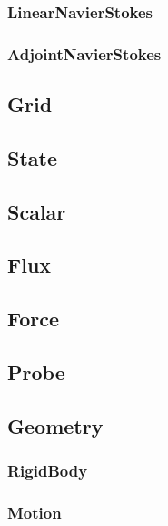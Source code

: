 \documentclass[11pt]{article}
\begin{document}
\subsubsection{LinearNavierStokes}
\subsubsection{AdjointNavierStokes}

\subsection{Grid}

\subsection{State}

\subsection{Scalar}
\subsection{Flux}
\subsection{Force}
\subsection{Probe}
\subsection{Geometry}
\subsubsection{RigidBody}
\subsubsection{Motion}




% 
% 
\end{document}
